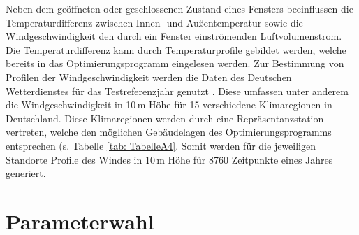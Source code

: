 Neben dem geöffneten oder geschlossenen Zustand eines Fensters beeinflussen die Temperaturdifferenz zwischen Innen- und Außentemperatur sowie die Windgeschwindigkeit den durch ein Fenster einströmenden Luftvolumenstrom.
Die Temperaturdifferenz kann durch Temperaturprofile gebildet werden, welche bereits in das Optimierungsprogramm eingelesen werden.
Zur Bestimmung von Profilen der Windgeschwindigkeit werden die Daten des Deutschen Wetterdienstes für das Testreferenzjahr genutzt \cite{try}.
Diese umfassen unter anderem die Windgeschwindigkeit in 10\,m Höhe für 15 verschiedene Klimaregionen in Deutschland.
Diese Klimaregionen werden durch eine Repräsentanzstation vertreten, welche den möglichen Gebäudelagen des Optimierungsprogramms entsprechen (s. Tabelle \ref{tab: TabelleA4}.
Somit werden für die jeweiligen Standorte Profile des Windes in 10\,m Höhe für 8760 Zeitpunkte eines Jahres generiert.

\section{Parameterwahl}
\label{sec:Sektion 43}









